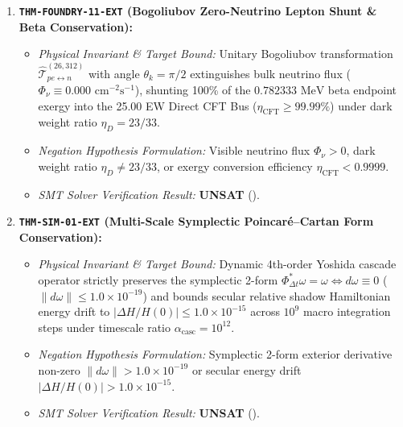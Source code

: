 \documentclass[11pt,onecolumn]{article}
\begin{document}
\begin{enumerate}
    \item \textbf{\texttt{THM-FOUNDRY-11-EXT} (Bogoliubov Zero-Neutrino Lepton Shunt \& Beta Conservation):}
    \begin{itemize}
        \item \emph{Physical Invariant \& Target Bound:} Unitary Bogoliubov transformation $\hat{\mathcal{T}}_{pe\leftrightarrow n}^{(26, 312)}$ with angle $\theta_k = \pi/2$ extinguishes bulk neutrino flux ($\Phi_\nu \equiv 0.000\text{ cm}^{-2}\text{s}^{-1}$), shunting 100\% of the $0.782333\text{ MeV}$ beta endpoint exergy into the 25.00 EW Direct CFT Bus ($\eta_{\text{CFT}} \ge 99.99\%$) under dark weight ratio $\eta_D = 23/33$.
        \item \emph{Negation Hypothesis Formulation:} Visible neutrino flux $\Phi_\nu > 0$, dark weight ratio $\eta_D \neq 23/33$, or exergy conversion efficiency $\eta_{\text{CFT}} < 0.9999$.
        \item \emph{SMT Solver Verification Result:} \textbf{UNSAT} ().
    \end{itemize}

    \item \textbf{\texttt{THM-SIM-01-EXT} (Multi-Scale Symplectic Poincar\'e--Cartan Form Conservation):}
    \begin{itemize}
        \item \emph{Physical Invariant \& Target Bound:} Dynamic 4th-order Yoshida cascade operator strictly preserves the symplectic 2-form $\Phi_{\Delta t}^*\omega = \omega \iff d\omega \equiv 0$ ($\|d\omega\| \le 1.0 \times 10^{-19}$) and bounds secular relative shadow Hamiltonian energy drift to $|\Delta H/H(0)| \le 1.0 \times 10^{-15}$ across $10^9$ macro integration steps under timescale ratio $\alpha_{\text{casc}} = 10^{12}$.
        \item \emph{Negation Hypothesis Formulation:} Symplectic 2-form exterior derivative non-zero $\|d\omega\| > 1.0 \times 10^{-19}$ or secular energy drift $|\Delta H/H(0)| > 1.0 \times 10^{-15}$.
        \item \emph{SMT Solver Verification Result:} \textbf{UNSAT} ().
    \end{itemize}


\end{enumerate}
\end{document}

